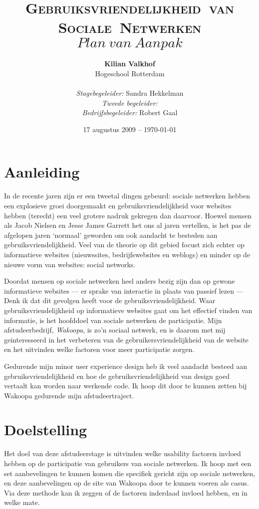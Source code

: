 \documentclass[a4paper, 10pt, pdftex]{article}
\title{\textsc{Gebruiksvriendelijkheid~van Sociale~Netwerken} \linebreak $Plan~van~Aanpak$}
\author{\textbf{Kilian Valkhof}\\
  Hogeschool Rotterdam\\
  \\
  \textit{Stagebegeleider:} Sandra Hekkelman\\
  \textit{Tweede begeleider:}\\
  \textit{Bedrijfsbegeleider:} Robert Gaal}
\date{17 augustus 2009 -- \today}
\begin{document}
  \normalem
  \maketitle

  \newpage
  \tableofcontents

  \newpage
\section{Aanleiding}
In de recente jaren zijn er een tweetal dingen gebeurd: sociale netwerken hebben een explosieve groei doorgemaakt
en gebruiksvriendelijkheid voor websites hebben (terecht) een veel grotere nadruk gekregen dan daarvoor. Hoewel mensen
als Jacob Nielsen en Jesse James Garrett het ons al jaren vertellen, is het pas de afgelopen jaren `normaal' geworden
om ook aandacht te besteden aan gebruiksvriendelijkheid. Veel van de theorie op dit gebied focust zich echter op
informatieve websites (nieuwssites, bedrijfswebsites en weblogs) en minder op de nieuwe vorm van websites: social networks.

Doordat mensen op sociale netwerken heel anders bezig zijn dan op gewone informatieve websites --- er sprake van interactie in plaats van passief lezen --- Denk ik dat dit gevolgen heeft voor de gebruiksvriendelijkheid. Waar gebruiksvriendelijkheid op informatieve websites gaat om het effectief vinden van informatie, is het hoofddoel van sociale netwerken de participatie. Mijn afstudeerbedrijf, \emph{Wakoopa}, is zo'n sociaal netwerk, en is daarom met mij geinteresseerd in het verbeteren van de gebruikersvriendelijkheid van de website en het uitvinden welke factoren voor meer participatie zorgen.

Gedurende mijn minor user experience design heb ik veel aandacht besteed aan gebruiksvriendelijkheid en hoe de gebruiksvriendelijkheid van design
goed vertaalt kan worden naar werkende code. Ik hoop dit door te kunnen zetten bij Wakoopa gedurende mijn afstudeertraject.

\section{Doelstelling}
    Het doel van deze afstudeerstage is uitvinden welke usability factoren invloed hebben op de participatie van gebruikers van sociale netwerken. Ik hoop met een set aanbevelingen te kunnen komen die specifiek gericht zijn op sociale netwerken, en deze aanbevelingen op de site van Wakoopa door te kunnen voeren als casus. Via deze methode kan ik zeggen of de factoren inderdaad invloed hebben, en in welke mate.
\end{document}
